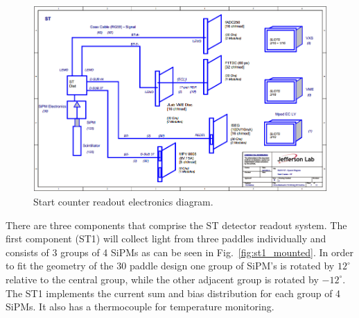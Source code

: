 	\begin{figure}[!htb]
		\centering
		\includegraphics[width=1.0\columnwidth]{design/figs/ST_Electronics_v2}
		\caption{Start counter readout electronics diagram.}
		\label{fig:Start Counter Electronics}
	\end{figure}

There are three components that comprise the ST detector readout system.  The first component (ST1) will collect light from three paddles individually and consists of 3 groups of 4 SiPMs as can be seen in Fig.~\ref{fig:st1_mounted}.  In order to fit the geometry of the 30 paddle design one group of SiPM's is rotated by $12^{\circ}$ relative to the central group, while the other adjacent group is rotated by $-12^{\circ}$.  The ST1 implements the current sum and bias distribution for each group of 4 SiPMs.  It also has a thermocouple for temperature monitoring.  

